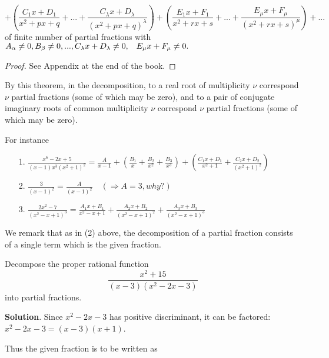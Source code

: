\documentclass[11pt]{amsbook}
\begin{document}
\[
	+(\frac{C_1x + D_1}{x^2+px+q} + ... + \frac{C_{\lambda}x + D_\lambda}{(x^2+px+q)^\lambda})+(\frac{E_1x+F_1}{x^2+rx+s}+...+\frac{E_\mu x+ F_\mu}{(x^2+rx+s)^\mu})+...
\]
of finite number of partial fractions with $A_\alpha \neq 0,  B_\beta \neq 0, ... ,C_\lambda x + D_\lambda \neq 0,\hspace{3mm}  E_\mu x + F_\mu \neq 0.$

\begin{proof}
	See Appendix at the end of the book.
\end{proof}

By this theorem, in the decomposition, to a real root of multiplicity $\nu$ correspond $\nu$ partial fractions (some of which may be zero), and to a pair of conjugate imaginary roots of common multiplicity $\nu$ correspond $\nu$ partial fractions (some of which may be zero).

For instance
\begin{enumerate}

	\item[1.]
 	$\frac{x^6-2x+5}{(x-1)x^3(x^2+1)^2} = \frac{A}{x-1} + (\frac{B_1}{x}+\frac{B_2}{x^2}+\frac{B_3}{x^3})+(\frac{C_1x+D_1}{x^2+1}+\frac{C_2x+D_2}{(x^2+1)^2})$

	\item[2.] 
	$\frac{3}{(x-1)^2}= \frac{A}{(x-1)^2} \quad (\Rightarrow A=3, why?)$
	
	\item [3.] 
	$\frac{2x^2-7}{(x^2-x+1)^3}=\frac{A_1x+B_1}{x^2-x+1}+\frac{A_2x+B_2}{(x^2-x+1)^2}+\frac{A_3x+B_3}{(x^2-x+1)^3}$

\end{enumerate}

We remark that as in (2) above, the decomposition of a partial fraction consists of a single term which is the given fraction.

\begin{exmp}
	Decompose the proper rational function
	\[
		\frac{x^2+15}{(x-3)(x^2-2x-3)}
	\]
	into partial fractions.
\end{exmp}

\textbf{Solution}. Since $x^2-2x-3$ has positive discriminant, it can be factored:  $x^2-2x-3 = (x-3)(x+1)$.

Thus the given fraction is to be written as
\end{document}
